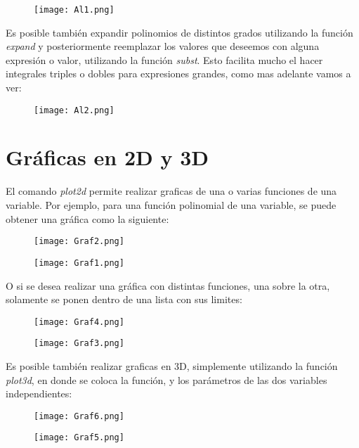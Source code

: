 \documentclass[12pt]{article}
\begin{document}
\begin{figure}[h!]
    \centering
\texttt{[image: Al1.png]}
\end{figure}

\pagebreak

Es posible también expandir polinomios de distintos grados utilizando la función \textit{expand} y posteriormente reemplazar los valores que deseemos con alguna expresión o valor, utilizando la función \textit{subst}. Esto facilita mucho el hacer integrales triples o dobles para expresiones grandes, como mas adelante vamos a ver:

\begin{figure}[h!]
    \centering
\texttt{[image: Al2.png]}
\end{figure}

\section{Gráficas en 2D y 3D}
El comando \textit{plot2d} permite realizar graficas de una o varias funciones de una variable. Por ejemplo, para una función polinomial de una variable, se puede obtener una gráfica como la siguiente:

\begin{figure}[h!]
    \centering
\texttt{[image: Graf2.png]}
\end{figure}
\begin{figure}[h!]
    \centering
\texttt{[image: Graf1.png]}
\end{figure}

\pagebreak

O si se desea realizar una gráfica con distintas funciones, una sobre la otra, solamente se ponen dentro de una lista con sus limites: 

\begin{figure}[h!]
    \centering
\texttt{[image: Graf4.png]}
\end{figure}
\begin{figure}[h!]
    \centering
\texttt{[image: Graf3.png]}
\end{figure}

Es posible también realizar graficas en 3D, simplemente utilizando la función \textit{plot3d}, en donde se coloca la función, y los parámetros de las dos variables independientes:

\begin{figure}[h!]
    \centering
\texttt{[image: Graf6.png]}
\end{figure}
\begin{figure}[h!]
    \centering
\texttt{[image: Graf5.png]}
\end{figure}
\end{document}

